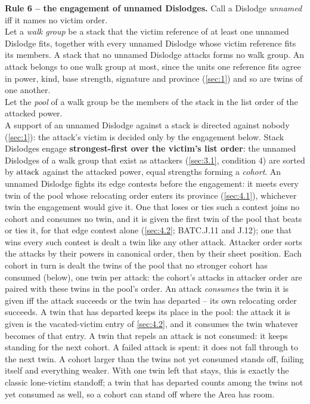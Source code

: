 \documentclass[12pt,a4paper]{article}
\begin{document}
\textbf{Rule 6 -- the engagement of unnamed Dislodges.}
Call a Dislodge \emph{unnamed} iff it names no victim order.\\
Let a \emph{walk group} be a stack that the victim reference of at least one unnamed Dislodge fits, together with every unnamed Dislodge whose victim reference fits its members.
A stack that no unnamed Dislodge attacks forms no walk group.
An attack belongs to one walk group at most, since the units one reference fits agree in power, kind, base strength, signature and province (\cref{sec:1}) and so are twins of one another.\\
Let the \emph{pool} of a walk group be the members of the stack in the list order of the attacked power.\\
A support of an unnamed Dislodge against a stack is directed against nobody (\cref{sec:1}): the attack's victim is decided only by the engagement below.
Stack Dislodges engage \textbf{strongest-first over the victim's list order}: the unnamed Dislodges of a walk group that exist as attackers (\cref{sec:3.1}, condition 4) are sorted by $\operatorname{attack}$ against the attacked power, equal strengths forming a \emph{cohort}.
An unnamed Dislodge fights its edge contests before the engagement: it meets every twin of the pool whose relocating order enters its province (\cref{sec:4.1}), whichever twin the engagement would give it.
One that loses or ties such a contest joins no cohort and consumes no twin, and it is given the first twin of the pool that beats or ties it, for that edge contest alone (\cref{sec:4.2}; BATC.J.11 and J.12); one that wins every such contest is dealt a twin like any other attack.
Attacker order sorts the attacks by their powers in canonical order, then by their sheet position.
Each cohort in turn is dealt the twins of the pool that no stronger cohort has consumed (below), one twin per attack: the cohort's attacks in attacker order are paired with these twins in the pool's order.
An attack \emph{consumes} the twin it is given iff the attack succeeds or the twin has departed -- its own relocating order succeeds.
A twin that has departed keeps its place in the pool: the attack it is given is the vacated-victim entry of \cref{sec:4.2}, and it consumes the twin whatever becomes of that entry.
A twin that repels an attack is not consumed: it keeps standing for the next cohort.
A failed attack is spent: it does not fall through to the next twin.
A cohort larger than the twins not yet consumed stands off, failing itself and everything weaker.
With one twin left that stays, this is exactly the classic lone-victim standoff; a twin that has departed counts among the twins not yet consumed as well, so a cohort can stand off where the Area has room.
\end{document}
